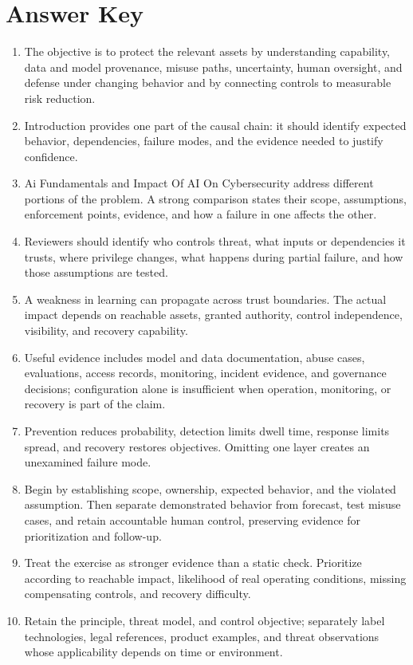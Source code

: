 \documentclass[11pt,letterpaper]{article}
\begin{document}
\section*{Answer Key}
\begin{enumerate}
\item The objective is to protect the relevant assets by understanding capability, data and model provenance, misuse paths, uncertainty, human oversight, and defense under changing behavior and by connecting controls to measurable risk reduction.
\item Introduction provides one part of the causal chain: it should identify expected behavior, dependencies, failure modes, and the evidence needed to justify confidence.
\item Ai Fundamentals and Impact Of AI On Cybersecurity address different portions of the problem. A strong comparison states their scope, assumptions, enforcement points, evidence, and how a failure in one affects the other.
\item Reviewers should identify who controls threat, what inputs or dependencies it trusts, where privilege changes, what happens during partial failure, and how those assumptions are tested.
\item A weakness in learning can propagate across trust boundaries. The actual impact depends on reachable assets, granted authority, control independence, visibility, and recovery capability.
\item Useful evidence includes model and data documentation, abuse cases, evaluations, access records, monitoring, incident evidence, and governance decisions; configuration alone is insufficient when operation, monitoring, or recovery is part of the claim.
\item Prevention reduces probability, detection limits dwell time, response limits spread, and recovery restores objectives. Omitting one layer creates an unexamined failure mode.
\item Begin by establishing scope, ownership, expected behavior, and the violated assumption. Then separate demonstrated behavior from forecast, test misuse cases, and retain accountable human control, preserving evidence for prioritization and follow-up.
\item Treat the exercise as stronger evidence than a static check. Prioritize according to reachable impact, likelihood of real operating conditions, missing compensating controls, and recovery difficulty.
\item Retain the principle, threat model, and control objective; separately label technologies, legal references, product examples, and threat observations whose applicability depends on time or environment.
\end{enumerate}
\end{document}
